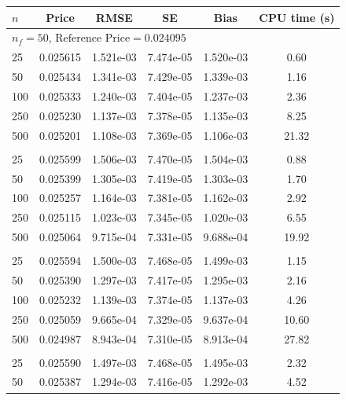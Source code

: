 \documentclass[11pt]{article}%
\theoremstyle{definition}
\begin{document}
\begin{table}[tph]
  \begin{center}
  \begin{tabular}{lccccc}
    \hline\hline
    $n$ & Price & RMSE & SE & Bias & CPU time (s) \\
    \hline
    \multicolumn{6}{l}{$n_f = 50$, $\text{Reference Price} = 0.024095$} \\
      25 & 0.025615 & 1.521e-03 & 7.474e-05 & 1.520e-03 & 0.60 \\
      50 & 0.025434 & 1.341e-03 & 7.429e-05 & 1.339e-03 & 1.16 \\
     100 & 0.025333 & 1.240e-03 & 7.404e-05 & 1.237e-03 & 2.36 \\
     250 & 0.025230 & 1.137e-03 & 7.378e-05 & 1.135e-03 & 8.25 \\
     500 & 0.025201 & 1.108e-03 & 7.369e-05 & 1.106e-03 & 21.32 \\
    \addlinespace
    \multicolumn{6}{l}{$n_f = 100$, $\text{Reference Price} = 0.024095$} \\
      25 & 0.025599 & 1.506e-03 & 7.470e-05 & 1.504e-03 & 0.88 \\
      50 & 0.025399 & 1.305e-03 & 7.419e-05 & 1.303e-03 & 1.70 \\
     100 & 0.025257 & 1.164e-03 & 7.381e-05 & 1.162e-03 & 2.92 \\
     250 & 0.025115 & 1.023e-03 & 7.345e-05 & 1.020e-03 & 6.55 \\
     500 & 0.025064 & 9.715e-04 & 7.331e-05 & 9.688e-04 & 19.92 \\
    \addlinespace
    \multicolumn{6}{l}{$n_f = 200$, $\text{Reference Price} = 0.024095$} \\
      25 & 0.025594 & 1.500e-03 & 7.468e-05 & 1.499e-03 & 1.15 \\
      50 & 0.025390 & 1.297e-03 & 7.417e-05 & 1.295e-03 & 2.16 \\
     100 & 0.025232 & 1.139e-03 & 7.374e-05 & 1.137e-03 & 4.26 \\
     250 & 0.025059 & 9.665e-04 & 7.329e-05 & 9.637e-04 & 10.60 \\
     500 & 0.024987 & 8.943e-04 & 7.310e-05 & 8.913e-04 & 27.82 \\
    \addlinespace
    \multicolumn{6}{l}{$n_f = 400$, $\text{Reference Price} = 0.024095$} \\
      25 & 0.025590 & 1.497e-03 & 7.468e-05 & 1.495e-03 & 2.32 \\
      50 & 0.025387 & 1.294e-03 & 7.416e-05 & 1.292e-03 & 4.52 \\

\end{tabular}
\end{center}
\end{table}
\end{document}
